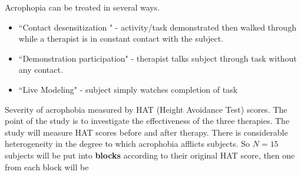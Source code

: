 \newpage
{}
\bigkn
Acrophopia can be treated in several ways.  
\begin{itemize}
\item
``Contact desensitization " - activity/task demonstrated then walked through 
while a therapist is in constant contact with the subject.
\item
``Demonstration participation" - therapist talks subject through task without
any contact.
\item
``Live Modeling" - subject simply watches completion of task
\end{itemize}
Severity of acrophobia measured by HAT (Height Avoidance Test) scores.
The point of the study is to investigate the effectiveness of the three
therapies.  The study will measure HAT scores before and after therapy.
There is considerable heterogeneity  in the degree to which
acrophobia afflicts subjects.  So $N=15$ subjects will be put into {\bf blocks}
according to their original HAT score, then one from each block will be
